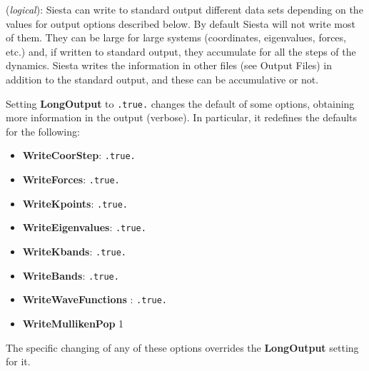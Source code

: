 \documentclass[11pt]{article}
\begin{document}
\begin{description}
\itemsep 10pt
\parsep 0pt

\item[{\bf LongOutput}] ({\it logical}):
{\sc Siesta} can write to standard output different data sets
depending on the values for output options described below.
By default {\sc Siesta} will not write most of them. They can be
large for large systems (coordinates, eigenvalues, forces, etc.)
and, if written to standard output, they accumulate for all the steps of 
the dynamics. {\sc Siesta} writes the information in other files
(see Output Files) in addition to the standard output, and these
can be accumulative or not.

Setting {\bf LongOutput} to {\tt .true.} changes the default of
some options, obtaining more information in the output (verbose).
In particular, it redefines the defaults for the following:

\begin{itemize}

\item
{\bf WriteCoorStep}:
 {\tt .true.}
\item
{\bf WriteForces}:
 {\tt .true.}
\item
{\bf WriteKpoints}:
 {\tt .true.}
\item
{\bf WriteEigenvalues}:
 {\tt .true.}
\item
{\bf WriteKbands}:
 {\tt .true.}
\item
{\bf WriteBands}:
 {\tt .true.}
\item
{\bf WriteWaveFunctions}
:
 {\tt .true.}
\item
{\bf WriteMullikenPop} 
 1

\end{itemize}

The specific changing of any of these options overrides the
{\bf LongOutput} setting for it.


\end{description}
\end{document}
